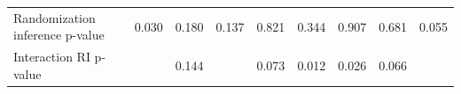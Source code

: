 \begin{tabular}{lcccccccc}
      &       &       &       &       &       &       &       &  \\

\midrule
Randomization inference p-value & 0.030 & 0.180 & 0.137 & 0.821 & 0.344 & 0.907 & 0.681 & 0.055 \\
Interaction RI p-value &  & 0.144 &  & 0.073 & 0.012 & 0.026 & 0.066 &  \\
\bottomrule
\end{tabular}%


